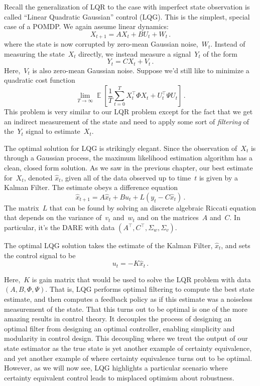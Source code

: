 \documentclass{tufte-book}
\begin{document}
Recall the generalization of LQR to the case with imperfect state
observation is called ``Linear Quadratic Gaussian'' control (LQG). This
is the simplest, special case of a POMDP. We again assume linear
dynamics: \[
    X_{t+1} = AX_t + B U_t + W_t\,.
\] where the state is now corrupted by zero-mean Gaussian
noise,~\(W_t\). Instead of measuring the state~\(X_t\) directly, we
instead measure a signal~\(Y_t\) of the form \[
    Y_t = C X_t + V_t\,.
\] Here,~\(V_t\) is also zero-mean Gaussian noise. Suppose we'd still
like to minimize a quadratic cost function \[
\lim_{T\rightarrow \infty} \mathop\mathbb{E}\left[\frac{1}{T} \sum_{t=0}^{T} X_t^\top \Phi X_t + U_t^\top \Psi U_t\right] \,.
\] This problem is very similar to our LQR problem except for the fact
that we get an indirect measurement of the state and need to apply some
sort of \emph{filtering} of the~\(Y_t\) signal to estimate~\(X_t\).

The optimal solution for LQG is strikingly elegant. Since the
observation of~\(X_t\) is through a Gaussian process, the maximum
likelihood estimation algorithm has a clean, closed form solution. As we
saw in the previous chapter, our best estimate for~\(X_t\), denoted
\(\hat{x}_t\), given all of the data observed up to time~\(t\) is given
by a Kalman Filter. The estimate obeys a difference equation \[
 \hat{x}_{t+1}  = A\hat{x}_t + B u_t + L(y_t-C\hat{x}_t)\,.
\] The matrix~\(L\) that can be found by solving an discrete algebraic
Riccati equation that depends on the variance of~\(v_t\) and~\(w_t\) and
on the matrices~\(A\) and~\(C\). In particular, it's the DARE with data
\((A^\top,C^\top,\Sigma_w,\Sigma_v)\).

The optimal LQG solution takes the estimate of the Kalman Filter,
\(\hat{x}_t\), and sets the control signal to be \[
    u_t = -K\hat{x}_t\,.
\]

Here,~\(K\) is gain matrix that would be used to solve the LQR problem
with data~\((A,B,\Phi,\Psi)\). That is, LQG performs optimal filtering
to compute the best state estimate, and then computes a feedback policy
as if this estimate was a noiseless measurement of the state. That this
turns out to be optimal is one of the more amazing results in control
theory. It decouples the process of designing an optimal filter from
designing an optimal controller, enabling simplicity and modularity in
control design. This decoupling where we treat the output of our state
estimator as the true state is yet another example of certainty
equivalence, and yet another example of where certainty equivalence
turns out to be optimal. However, as we will now see, LQG highlights a
particular scenario where certainty equivalent control leads to
misplaced optimism about robustness.
\end{document}
